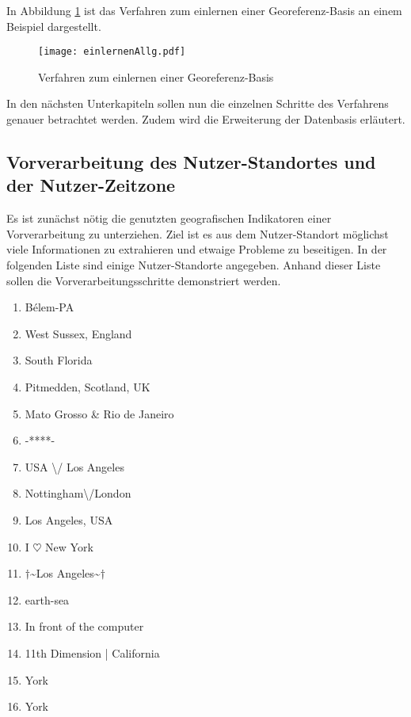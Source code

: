 			In Abbildung \ref{img:EinlernenAllg} ist das Verfahren zum einlernen einer Georeferenz-Basis an einem Beispiel dargestellt.

			\begin{figure}[!ht]
					\begin{center}
						\texttt{[image: einlernenAllg.pdf]}
						\caption{Verfahren zum einlernen einer Georeferenz-Basis}
						\label{img:EinlernenAllg}
					\end{center}
			\end{figure}	

			In den nächsten Unterkapiteln sollen nun die einzelnen Schritte des Verfahrens genauer betrachtet werden. 
			Zudem wird die Erweiterung der Datenbasis erläutert.

		\subsection{Vorverarbeitung des Nutzer-Standortes und der Nutzer-Zeitzone} \label{subsec:VorverarbeitungStandortZeitzone} 
			
			Es ist zunächst nötig die genutzten geografischen Indikatoren einer Vorverarbeitung zu unterziehen. 
			Ziel ist es aus dem Nutzer-Standort möglichst viele Informationen zu extrahieren und etwaige Probleme zu beseitigen.
			In der folgenden Liste sind einige Nutzer-Standorte angegeben. 
			Anhand dieser Liste sollen die Vorverarbeitungsschritte demonstriert werden.

			\begin{multicols}{2}
			\begin{enumerate}
				\item Bélem-PA
				\item West Sussex, England
				\item South Florida
				\item Pitmedden,  Scotland, UK
				\item Mato Grosso \& Rio de Janeiro
				\item -****-
				\item USA \textbackslash/ Los Angeles
				\item Nottingham\textbackslash/London
				\item Los Angeles, USA
				\item I $\heartsuit$ New York 
				\item $\dagger$\textasciitilde Los Angeles\textasciitilde$\dagger$
				\item earth-sea
				\item In front of the computer
				\item 11th Dimension | California
				\item York
				\item York
			\end{enumerate}
			\end{multicols}
				
